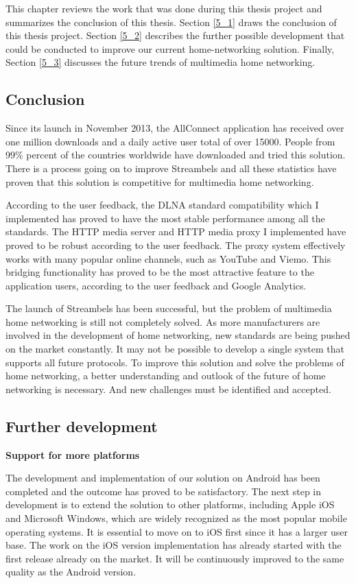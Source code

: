 This chapter reviews the work that was done during this thesis project and
summarizes the conclusion of this thesis. Section \ref{5_1} draws the
conclusion of this thesis project. Section \ref{5_2} describes the further
possible development that could be conducted to improve our current
home-networking solution. Finally, Section \ref{5_3} discusses the future trends
of multimedia home networking.
\subsection{Conclusion\label{5_1}}
Since its launch in November 2013, the AllConnect application has received over
one million downloads and a daily active user total of over 15000. People from 99\%
percent of the countries worldwide have downloaded and tried this solution.
There is a process going on to improve Streambels and all these
statistics have proven that this solution is competitive for multimedia home
networking.

According to the user feedback, the DLNA standard compatibility which I
implemented has proved to have the most stable performance among all the
standards. The HTTP media server and HTTP media proxy I implemented have proved
to be robust according to the user feedback. The proxy system effectively works
with many popular online channels, such as YouTube and Viemo. This bridging
functionality has proved to be the most attractive feature to the application
users, according to the user feedback and Google Analytics.

The launch of Streambels has been successful, but the problem of multimedia home
networking is still not completely solved. As more manufacturers are involved
in the development of home networking, new standards are being pushed on the
market constantly. It may not be possible to develop a single system that
supports all future protocols. To improve this solution and solve the problems
of home networking, a better understanding and outlook of the future of home
networking is necessary. And new challenges must be identified and accepted.
\clearpage
\subsection{Further development\label{5_2}}
\textbf{Support for more platforms}

The development and implementation of our solution on Android has been completed
and the outcome has proved to be satisfactory. The next step in development is
to extend the solution to other platforms, including Apple iOS and Microsoft
Windows, which are widely recognized as the most popular mobile operating
systems. It is essential to move on to iOS first since it has a larger user
base. The work on the iOS version implementation has already started with the
first release already on the market. It will be continuously improved
to the same quality as the Android version.

